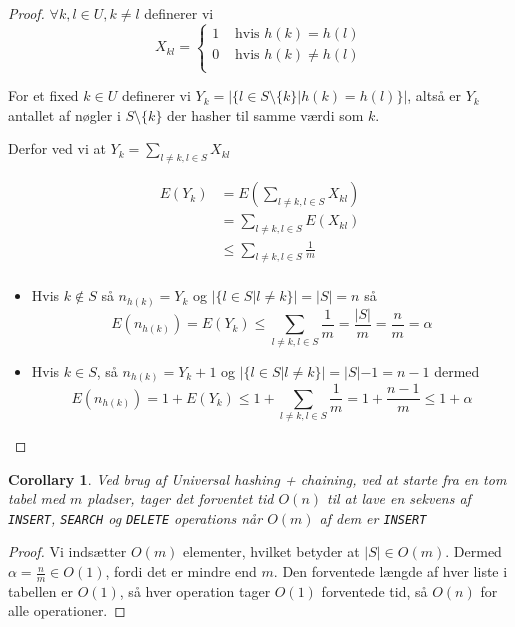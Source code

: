 \documentclass[11pt]{article}
\newtheorem{corollary}[theorem]{Corollary}
\theoremstyle{definition}
\theoremstyle{remark}
\begin{document}
\begin{proof}
  $\forall k, l \in U, k \neq l$ definerer vi
  \[
    X_{kl} = \begin{cases}
      1 & \text{ hvis } h(k) = h(l) \\
      0 & \text{ hvis } h(k) \neq h(l) \\
      \end{cases}
  \]

  For et fixed $k \in U$ definerer vi $Y_{k} = |\{ l \in S \setminus \{k\} | h(k) = h(l) \}|$, altså er $Y_{k}$
  antallet af nøgler i $S \setminus \{k\}$ der hasher til samme værdi som $k$.

  Derfor ved vi at $Y_k = \sum_{l \neq k, l \in S} X_{kl}$


  \begin{equation}
    \begin{split}
      E(Y_{k}) &= E( \sum_{l \neq k, l \in S} X_{kl}) \\
               &= \sum_{l \neq k, l \in S} E(X_{kl}) \\
               &\leq \sum_{l \neq k, l \in S} \frac{1}{m}\\
    \end{split}
  \end{equation}

  \begin{itemize}
   \item Hvis $k \notin S$ så $n_{h(k)} = Y_{k}$  og $|\{l \in S | l \neq k\}| = |S| = n$ så \[ E(n_{h(k)}) = E(Y_{k}) \leq \sum_{l \neq k, l \in S} \frac{1}{m} = \frac{|S|}{m} = \frac{n}{m} = \alpha \]
   \item Hvis $k \in S$, så $n_{h(k)} = Y_{k}+1$ og $|\{l \in S | l \neq k\}| = |S|-1  = n - 1$ dermed \[ E(n_{h(k)}) = 1 + E(Y_{k}) \leq 1 + \sum_{l \neq k, l \in S} \frac{1}{m} = 1 + \frac{n-1}{m} \leq 1 + \alpha \]
  \end{itemize}
  
\end{proof}

\begin{corollary}
 Ved brug af Universal hashing + chaining, ved at starte fra en tom tabel med $m$ pladser, tager det forventet tid $O(n)$ til at lave en sekvens af \texttt{INSERT}, \texttt{SEARCH} og \texttt{DELETE} operations når $O(m)$ af dem er \texttt{INSERT}
\end{corollary}

\begin{proof}

  Vi indsætter $O(m)$ elementer, hvilket betyder at $|S| \in O(m)$. Dermed $\alpha = \frac{n}{m} \in O(1)$, fordi det er mindre end $m$.
  Den forventede længde af hver liste i tabellen er $O(1)$, så hver operation tager $O(1)$ forventede tid, så $O(n)$ for alle operationer. 
\end{proof}
\end{document}
